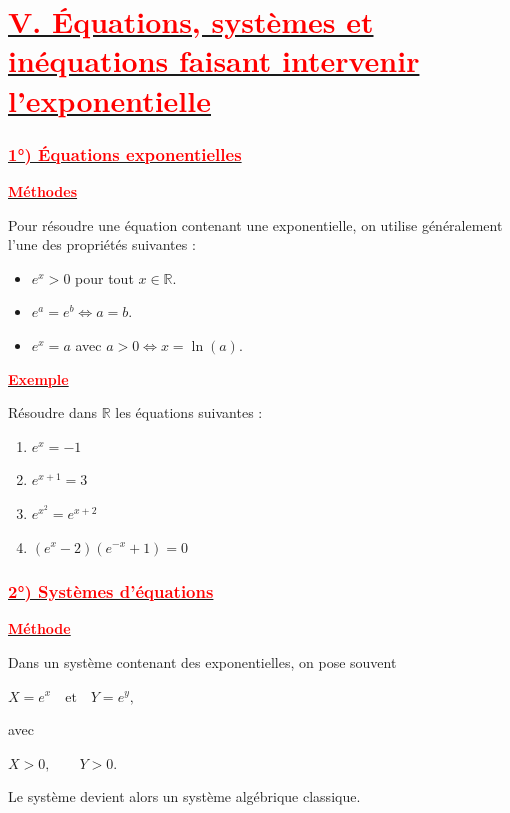 \documentclass[12pt,a4paper]{article}
\begin{document}
\section*{\underline{\textbf{\textcolor{red}{V. Équations, systèmes et inéquations faisant intervenir l'exponentielle}}}}

\subsubsection*{\underline{\textbf{\textcolor{red}{1°) Équations exponentielles}}}}

\underline{\textbf{\textcolor{red}{Méthodes}}}

Pour résoudre une équation contenant une exponentielle, on utilise généralement l'une des propriétés suivantes :

\begin{itemize}
    \item \(e^x>0\) pour tout \(x\in\mathbb{R}\).
    \item \(e^a=e^b \Longleftrightarrow a=b\).
    \item \(e^x=a\) avec \(a>0\Longleftrightarrow x=\ln(a)\).
\end{itemize}

\underline{\textbf{\textcolor{red}{Exemple}}}

Résoudre dans \(\mathbb{R}\) les équations suivantes :

\begin{enumerate}[label=\alph*)]
    \item \(e^x=-1\)
    \item \(e^{x+1}=3\)
    \item \(e^{x^2}=e^{x+2}\)
    \item \((e^x-2)(e^{-x}+1)=0\)
\end{enumerate}

\subsubsection*{\underline{\textbf{\textcolor{red}{ 2°) Systèmes d'équations }}}}

\underline{\textbf{\textcolor{red}{Méthode}}}

Dans un système contenant des exponentielles, on pose souvent

\(
X=e^x
\quad\text{et}\quad
Y=e^y,
\)

avec

\(
X>0,\qquad Y>0.
\)

Le système devient alors un système algébrique classique.
\end{document}
